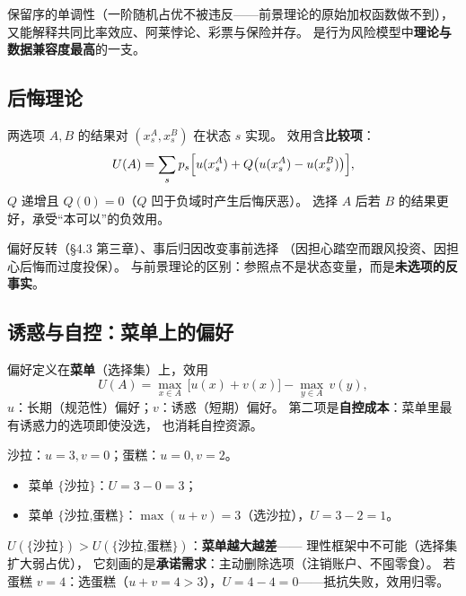 保留序的单调性（一阶随机占优不被违反——前景理论的原始加权函数做不到），
又能解释共同比率效应、阿莱悖论、彩票与保险并存。
是行为风险模型中\textbf{理论与数据兼容度最高}的一支。

\subsection{后悔理论}

两选项 $A,B$ 的结果对 $(x^A_s,x^B_s)$ 在状态 $s$ 实现。
效用含\textbf{比较项}：
\[
U(A)=\sum_s p_s\Bigl[u(x^A_s)+Q\bigl(u(x^A_s)-u(x^B_s)\bigr)\Bigr],
\]
$Q$ 递增且 $Q(0)=0$（$Q$ 凹于负域时产生后悔厌恶）。
选择 $A$ 后若 $B$ 的结果更好，承受“本可以”的负效用。

偏好反转（§4.3 第三章）、事后归因改变事前选择
（因担心踏空而跟风投资、因担心后悔而过度投保）。
与前景理论的区别：参照点不是状态变量，而是\textbf{未选项的反事实}。

\subsection{诱惑与自控：菜单上的偏好}

偏好定义在\textbf{菜单}（选择集）上，效用
\[
U(A)=\max_{x\in A}\,\bigl[u(x)+v(x)\bigr]-\max_{y\in A}\,v(y),
\]
$u$：长期（规范性）偏好；$v$：诱惑（短期）偏好。
第二项是\textbf{自控成本}：菜单里最有诱惑力的选项即使没选，
也消耗自控资源。

沙拉：$u=3,v=0$；蛋糕：$u=0,v=2$。
\begin{itemize}
  \item 菜单 $\{\text{沙拉}\}$：$U=3-0=3$；
  \item 菜单 $\{\text{沙拉,蛋糕}\}$：$\max(u+v)=3$（选沙拉），$U=3-2=1$。
\end{itemize}
$U(\{\text{沙拉}\})>U(\{\text{沙拉,蛋糕}\})$：\textbf{菜单越大越差}——
理性框架中不可能（选择集扩大弱占优），
它刻画的是\textbf{承诺需求}：主动删除选项（注销账户、不囤零食）。
若蛋糕 $v=4$：选蛋糕（$u+v=4>3$），$U=4-4=0$——抵抗失败，效用归零。

